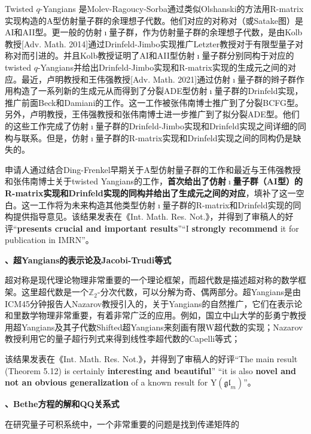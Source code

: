 \documentclass[12pt,UTF8,AutoFakeBold=4,a4paper]{ctexart}
\begin{document}
Twisted $q$-Yangians 是Molev-Ragoucy-Sorba通过类似Olshanski的方法用R-matrix实现构造的A型仿射量子群的余理想子代数。他们对应的对称对（或Satake图）是AI和AII型。更一般的仿射$\imath$量子群，作为仿射量子群的余理想子代数，是由Kolb教授[Adv. Math. 2014]通过Drinfeld-Jimbo实现推广Letzter教授对于有限型量子对称对而引进的。并且Kolb教授证明了AI和AII型仿射$\imath$量子群分别同构于对应的twisted $q$-Yangians并给出Drinfeld-Jimbo实现和R-matrix实现的生成元之间的对应。最近，卢明教授和王伟强教授[Adv. Math. 2021]通过仿射$\imath$量子群的辫子群作用构造了一系列新的生成元从而得到了分裂ADE型仿射$\imath$量子群的Drinfeld实现，推广前面Beck和Damiani的工作。这一工作被张伟南博士推广到了分裂BCFG型。另外，卢明教授，王伟强教授和张伟南博士进一步推广到了拟分裂ADE型。他们的这些工作完成了仿射$\imath$量子群的Drinfeld-Jimbo实现和Drinfeld实现之间详细的同构与联系。但是，仿射$\imath$量子群的R-matrix实现和Drinfeld实现之间的同构仍是缺失的。

申请人通过结合Ding-Frenkel早期关于A型仿射量子群的工作和最近与王伟强教授和张伟南博士关于twisted Yangians的工作，\textbf{首次给出了仿射$\imath$量子群（AI型）的R-matrix实现和Drinfeld实现的同构并给出了生成元之间的对应}，填补了这一空白。这一工作将为未来构造其他类型仿射$\imath$量子群的R-matrix和Drinfeld实现的同构提供指导意见。该结果发表在《Int.
Math. Res. Not.》，并得到了审稿人的好评“\textbf{presents crucial and important results}”“I \textbf{strongly recommend} it for publication in IMRN”。

\medskip

\textbf{、超Yangians的表示论及Jacobi-Trudi等式}

超对称是现代理论物理非常重要的一个理论框架，而超代数是描述超对称的数学框架。这里超代数是一个$\mathbb Z_2$-分次代数，可以分解为奇、偶两部分。超Yangians是由ICM45分钟报告人Nazarov教授引入的，关于Yangians的自然推广，它们在表示论和里数学物理非常重要，有着非常广泛的应用。例如，国立中山大学的彭勇宁教授用超Yangians及其子代数Shifted超Yangians来刻画有限W超代数的实现；Nazarov教授利用它的量子超行列式来得到线性李超代数的Capelli等式；



该结果发表在《Int. Math. Res. Not.》，并得到了审稿人的好评“The main result (Theorem 5.12) is certainly \textbf{interesting and
beautiful}” “it is also \textbf{novel and not an obvious generalization} of a known
result for $\mathrm{Y}(\mathfrak{gl}_m)$”。


\medskip

\textbf{、Bethe方程的解和QQ关系式}

在研究量子可积系统中，一个非常重要的问题是找到传递矩阵的
\end{document}
